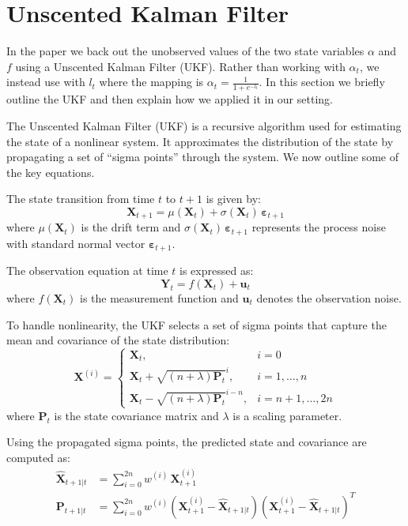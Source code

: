 \section{Unscented Kalman Filter}
In the paper we back out the unobserved values of the two state variables $\alpha$ and $f$ using a Unscented Kalman Filter (UKF). Rather than working with $\alpha_t$, we instead use with $l_t$ where the mapping is $\alpha_t = \frac{1}{1+e^{-l_t}}$. In this section we briefly outline the UKF and then explain how we applied it in our setting.

The Unscented Kalman Filter (UKF) is a recursive algorithm used for estimating the state of a nonlinear system. It approximates the distribution of the state by propagating a set of ``sigma points'' through the system. We now outline some of the key equations. 

The state transition from time \( t \) to \( t+1 \) is given by:
\begin{equation}
    \mathbf{X}_{t+1} = \mu(\mathbf{X}_t) + \sigma(\mathbf{X}_t) \, \boldsymbol{\varepsilon}_{t+1}
\end{equation}
where \( \mu(\mathbf{X}_t) \) is the drift term and \( \sigma(\mathbf{X}_t) \, \boldsymbol{\varepsilon}_{t+1} \) represents the process noise with standard normal vector \( \boldsymbol{\varepsilon}_{t+1} \).

The observation equation at time \( t \) is expressed as:
\begin{equation}
    \mathbf{Y}_t = f(\mathbf{X}_t) + \mathbf{u}_t
\end{equation}
where \( f(\mathbf{X}_t) \) is the measurement function and \( \mathbf{u}_t \) denotes the observation noise.

To handle nonlinearity, the UKF selects a set of sigma points that capture the mean and covariance of the state distribution:
\begin{equation}
    \mathbf{X}^{(i)} = \begin{cases}
        \mathbf{X}_t, & i = 0 \\
        \mathbf{X}_t + \sqrt{(n + \lambda) \mathbf{P}_t}^i, & i = 1, \dots, n \\
        \mathbf{X}_t - \sqrt{(n + \lambda) \mathbf{P}_t}^{i-n}, & i = n+1, \dots, 2n
    \end{cases}
\end{equation}
where \( \mathbf{P}_t \) is the state covariance matrix and \( \lambda \) is a scaling parameter.

Using the propagated sigma points, the predicted state and covariance are computed as:
\begin{align}
    \hat{\mathbf{X}}_{t+1|t} &= \sum_{i=0}^{2n} w^{(i)} \, \mathbf{X}^{(i)}_{t+1} \\
    \mathbf{P}_{t+1|t} &= \sum_{i=0}^{2n} w^{(i)} \left( \mathbf{X}^{(i)}_{t+1} - \hat{\mathbf{X}}_{t+1|t} \right) \left( \mathbf{X}^{(i)}_{t+1} - \hat{\mathbf{X}}_{t+1|t} \right)^T
\end{align}
